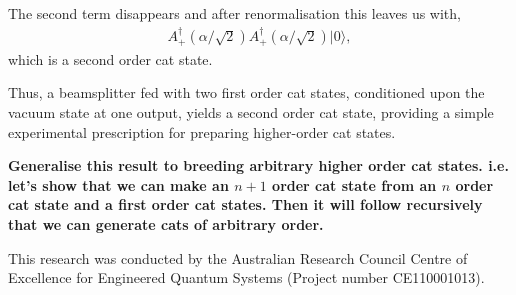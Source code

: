 \documentclass[aps,prl,twocolumn,amsmath,amssymb,nofootinbib,superscriptaddress]{revtex4}
\newcommand{\ket}[1]{|#1\rangle}
\begin{document}
The second term disappears and after renormalisation this leaves us with,
\begin{eqnarray}
A_+^\dag(\alpha/\sqrt{2}) A_+^\dag(\alpha/\sqrt{2})\ket{0},
\end{eqnarray}
which is a second order cat state.

Thus, a beamsplitter fed with two first order cat states, conditioned upon the vacuum state at one output, yields a second order cat state, providing a simple experimental prescription for preparing higher-order cat states.

\textbf{Generalise this result to breeding arbitrary higher order cat states. i.e. let's show that we can make an $n+1$ order cat state from an $n$ order cat state and a first order cat states. Then it will follow recursively that we can generate cats of arbitrary order.}

\begin{acknowledgments}
This research was conducted by the Australian Research Council Centre of Excellence for Engineered Quantum Systems (Project number CE110001013). 
\end{acknowledgments}


\end{document}
